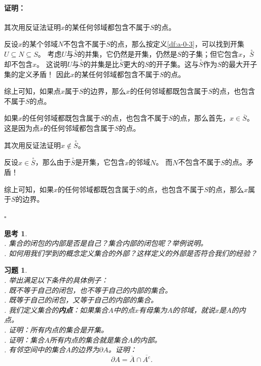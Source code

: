 \documentclass[12pt,UTF8]{ctexbook}
\theoremstyle{definition}
\theoremstyle{plain}
\newtheorem{sk}{思考}[section]
\newtheorem{xt}{习题}[section]
\renewenvironment{proof}{\paragraph{\textbf{证明：}}}{\hfill$\square$}
\begin{document}
\begin{appendix}
\begin{proof}
    其次用反证法证明$x$的某任何邻域都包含不属于$S$的点。
    
    反设$x$的某个邻域$N$不包含不属于$S$的点，那么按定义\ref{df:a-0-3}，可以找到开集$U\subseteq N\subseteq S$。
    考虑$U$与$\overset{\circ}{S}$的并集，它仍然是开集，仍然是$S$的子集；但它包含$x$，$\overset{\circ}{S}$却不包含$x$。
    这说明$U$与$\overset{\circ}{S}$的并集是比$\overset{\circ}{S}$更大的$S$的开子集。这与$\overset{\circ}{S}$作为$S$的最大开子集的定义矛盾！
    因此$x$的某任何邻域都包含不属于$S$的点。

    综上可知，如果点$x$属于$S$的边界，那么$x$的任何邻域都既包含属于$S$的点，也包含不属于$S$的点。

    如果$x$的任何邻域都既包含属于$S$的点，也包含不属于$S$的点，那么首先，$x\in \overline{S}$。这是因为点$x$的任何邻域都包含属于$S$的点。
    
    其次用反证法证明$x\notin\overset{\circ}{S}$。
    
    反设$x\in \overset{\circ}{S}$，那么由于$\overset{\circ}{S}$是开集，它包含$x$的邻域$N$。
    而$N$不包含不属于$S$的点。矛盾！

    综上可知，如果$x$的任何邻域都既包含属于$S$的点，也包含不属于$S$的点，那么$x$属于$S$的边界。

\end{proof}

\begin{sk}
    \mbox{} \\
    . 集合的闭包的内部是否是自己？集合内部的闭包呢？举例说明。\\
    . 如何用我们学到的概念定义集合的外部？这样定义的外部是否符合我们的经验？
\end{sk}

\begin{xt}
    \mbox{} \\
    . 举出满足以下条件的具体例子：\\
    . 既不等于自己的闭包，也不等于自己的内部的集合。\\
    . 既等于自己的闭包，又等于自己的内部的集合。\\
    . 我们定义集合的\textbf{内点}：如果集合$A$中的点$x$有母集为$A$的邻域，就说$x$是$A$的内点。\\
    . 证明：所有内点的集合是开集。\\
    . 证明：集合$A$所有内点的集合就是集合$A$的内部。\\
    . 有邻空间中的集合$A$的边界为$\partial A$。证明：
    $$ \partial A = \overline{A} \cap \overline{A^c}. $$
\end{xt}



\end{appendix}
\end{document}
